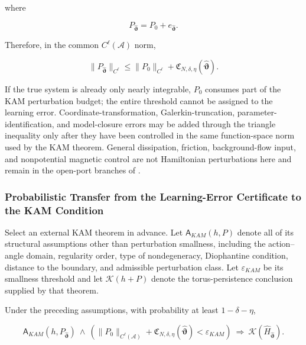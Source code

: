 where

\begin{equation}
\label{eq:chnn-4-56}
P_{\widehat{\bm{\vartheta}}} = P_{0} + e_{\widehat{\bm{\vartheta}}}.
\end{equation}

Therefore, in the common \(C^{\ell}\left( \mathcal{A} \right)\) norm,

\begin{equation}
\label{eq:chnn-4-57}
\left. \parallel P_{\widehat{\bm{\vartheta}}} \right.\parallel_{C^{\ell}} \leq \left. \parallel P_{0} \right.\parallel_{C^{\ell}} + \mathfrak{C}_{N,\delta,\eta}\left( \widehat{\bm{\vartheta}} \right).
\end{equation}

If the true system is already only nearly integrable, \(P_{0}\) consumes part of the KAM perturbation budget; the entire threshold cannot be assigned to the learning error. Coordinate-transformation, Galerkin-truncation, parameter-identification, and model-closure errors may be added through the triangle inequality only after they have been controlled in the same function-space norm used by the KAM theorem. General dissipation, friction, background-flow input, and nonpotential magnetic control are not Hamiltonian perturbations here and remain in the open-port branches of .

\subsubsection{Probabilistic Transfer from the Learning-Error Certificate to the KAM Condition}\label{sec:chnn-4-6-7}

Select an external KAM theorem in advance. Let \(\mathsf{A}_{KAM}(h,P)\) denote all of its structural assumptions other than perturbation smallness, including the action--angle domain, regularity order, type of nondegeneracy, Diophantine condition, distance to the boundary, and admissible perturbation class. Let \(\varepsilon_{KAM}\) be its smallness threshold and let \(\mathcal{K}(h+P)\) denote the torus-persistence conclusion supplied by that theorem.

\begin{proposition}\label{prop:kam-probability-transfer}
Under the preceding assumptions, with probability at least \(1-\delta-\eta\),

\begin{equation}
\label{eq:chnn-4-58}
\boxed{\mathsf{A}_{KAM}\left( h,P_{\widehat{\bm{\vartheta}}} \right)\  \land \ \left( \left. \parallel P_{0} \right.\parallel_{C^{\ell}\left( \mathcal{A} \right)} + \mathfrak{C}_{N,\delta,\eta}\left( \widehat{\bm{\vartheta}} \right) < \varepsilon_{KAM} \right)\  \Rightarrow \ \mathcal{K}\left( {\widehat{H}}_{\widehat{\bm{\vartheta}}} \right).}
\end{equation}
\end{proposition}

